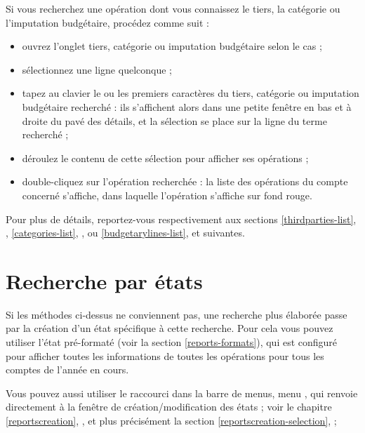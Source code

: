 Si vous recherchez une opération dont vous connaissez le tiers, la catégorie ou l'imputation budgétaire, procédez comme suit :

\begin{itemize}
	 \item ouvrez l'onglet tiers, catégorie ou imputation budgétaire selon le cas ;
	 \item sélectionnez une ligne quelconque ;
	 \item tapez au clavier le ou les premiers caractères du tiers, catégorie ou imputation budgétaire recherché : ils s'affichent alors dans une petite fenêtre en bas et à droite du pavé des détails, et la sélection se place sur la ligne du terme recherché ;
	 \item déroulez le contenu de cette sélection pour afficher ses opérations ;
	 \item double-cliquez sur l'opération recherchée : la liste des opérations du compte concerné s'affiche, dans laquelle l'opération s'affiche sur fond rouge{\couleur}.	 	 	 
\end{itemize}


Pour plus de détails, reportez-vous respectivement aux sections \vref{thirdparties-list}, , \vref{categories-list}, , ou \vref{budgetarylines-list},  et suivantes.


\section{Recherche par états\label{search-advanced} }

Si les méthodes ci-dessus ne conviennent pas, une recherche plus élaborée passe par la création d'un état spécifique à cette recherche. Pour cela vous pouvez utiliser l'état pré-formaté  (voir la section \vref{reports-formats}), qui est configuré pour afficher toutes les informations de toutes les opérations pour tous les comptes de l'année en cours. 


Vous pouvez aussi utiliser le raccourci dans la barre de menus, menu , qui renvoie directement à la fenêtre de création/modification des états ; voir le chapitre \vref{reportscreation}, , et plus précisément la section \vref{reportscreation-selection},  ;

